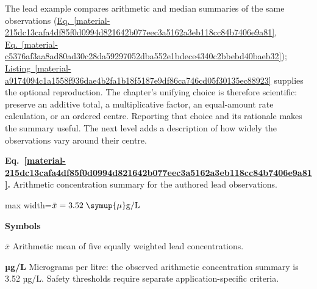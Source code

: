 \documentclass[11pt,a4paper]{article}
\begin{document}
The lead example compares arithmetic and median summaries of the same observations (\hyperref[material-215dc13cafa4df85f0d0994d821642b077eec3a5162a3eb118cc84b7406e9a81]{Eq.~\ref*{material-215dc13cafa4df85f0d0994d821642b077eec3a5162a3eb118cc84b7406e9a81}}, \hyperref[material-c5376af3aa8ad80ad30c28da59297052dba552e1bdece4340c2bbebd40baeb32]{Eq.~\ref*{material-c5376af3aa8ad80ad30c28da59297052dba552e1bdece4340c2bbebd40baeb32}}); \hyperref[material-a9174094c1a1558f936dae4b2fa1b18f5187e9df86ca746cd05f30135ec88923]{Listing~\ref*{material-a9174094c1a1558f936dae4b2fa1b18f5187e9df86ca746cd05f30135ec88923}} supplies the optional reproduction. The chapter's unifying choice is therefore scientific: preserve an additive total, a multiplicative factor, an equal-amount rate calculation, or an ordered centre. Reporting that choice and its rationale makes the summary useful. The next level adds a description of how widely the observations vary around their centre.


\par\medskip
\noindent\begin{minipage}{\linewidth}
\label{material-215dc13cafa4df85f0d0994d821642b077eec3a5162a3eb118cc84b7406e9a81}
\noindent\textbf{Eq.~\ref*{material-215dc13cafa4df85f0d0994d821642b077eec3a5162a3eb118cc84b7406e9a81}.} Arithmetic concentration summary for the authored lead observations.\par\nopagebreak
\begin{center}\begin{adjustbox}{max width=\linewidth}$\displaystyle \bar{x}=3.52\;\symup{\mu}\mathrm{g/L}$\end{adjustbox}\end{center}

\par\noindent\textbf{Symbols}

\par\noindent\textbf{\ensuremath{\bar{x}}} Arithmetic mean of five equally weighted lead concentrations.

\par\noindent\textbf{µg/L} Micrograms per litre: the observed arithmetic concentration summary is 3.52 µg/L. Safety thresholds require separate application-specific criteria.

\end{minipage}\par
\medskip
\end{document}

